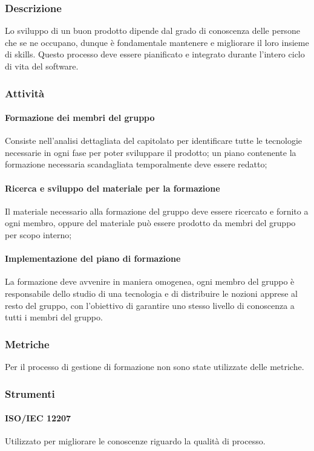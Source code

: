 \subsubsection{Descrizione}
Lo sviluppo di un buon prodotto dipende dal grado di conoscenza delle persone che se ne occupano, dunque è fondamentale mantenere e migliorare il loro insieme di skills.
Questo processo deve essere pianificato e integrato durante l'intero ciclo di vita del software.

\subsubsection{Attività}

\paragraph{Formazione dei membri del gruppo}
Consiste nell'analisi dettagliata del capitolato per identificare tutte le tecnologie necessarie in ogni fase per poter sviluppare il prodotto; un piano contenente la formazione necessaria scandagliata temporalmente deve essere redatto;
\paragraph{Ricerca e sviluppo del materiale per la formazione} 
Il materiale necessario alla formazione del gruppo deve essere ricercato e fornito a ogni membro, oppure del materiale può essere prodotto da membri del gruppo per scopo interno;
\paragraph{Implementazione del piano di formazione} 
La formazione deve avvenire in maniera omogenea, ogni membro del gruppo è responsabile dello studio di una tecnologia e di distribuire le nozioni apprese al resto del gruppo, con l'obiettivo di garantire uno stesso livello di conoscenza a tutti i membri del gruppo.

\subsubsection{Metriche} 
Per il processo di gestione di formazione non sono state utilizzate delle metriche.

\subsubsection{Strumenti} 
\paragraph{ISO/IEC 12207}
Utilizzato per migliorare le conoscenze riguardo la qualità di processo.
